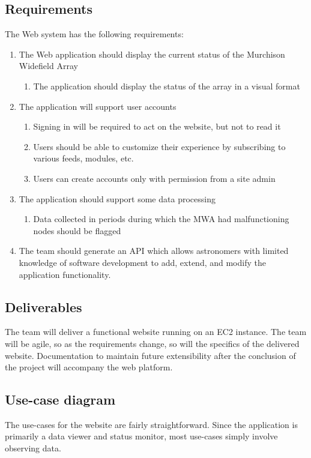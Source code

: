 \documentclass[12pt]{article}
\begin{document}
\begin{spacing}{1.5}
\section{Requirements}
The Web system has the following requirements:
\begin{enumerate}
\item The Web application should display the current status of the Murchison Widefield Array
	\begin{enumerate}
	\item The application should display the status of the array in a visual format
	\end{enumerate}
\item The application will support user accounts
	\begin{enumerate}
	\item Signing in will be required to act on the website, but not to read it
	\item Users should be able to customize their experience by subscribing to various feeds, modules, etc.
	\item Users can create accounts only with permission from a site admin
	\end{enumerate}
\item The application should support some data processing
	\begin{enumerate}
	\item Data collected in periods during which the MWA had malfunctioning nodes should be flagged
	\end{enumerate}
\item The team should generate an API which allows astronomers with limited knowledge of software development to add, extend, and modify the application functionality.
\end{enumerate}

\subsection{Deliverables}
The team will deliver a functional website running on an EC2 instance. The team will be agile, so as the requirements change, so will the specifics of the delivered website. Documentation to maintain future extensibility after the conclusion of the project will accompany the web platform.

\subsection{Use-case diagram}
The use-cases for the website are fairly straightforward. Since the application is primarily a data viewer and status monitor, most use-cases simply involve observing data.

\end{spacing}
\end{document}
